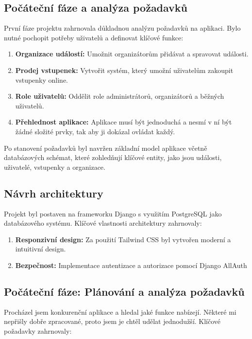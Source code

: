 \documentclass[12pt, a4paper,
twoside,        %
openright
]{report}
\begin{document}
\subsection{Počáteční fáze a analýza požadavků}

První fáze projektu zahrnovala důkladnou analýzu požadavků na aplikaci. Bylo nutné pochopit potřeby uživatelů a definovat klíčové funkce:

\begin{enumerate}
	\item \textbf{Organizace událostí:} Umožnit organizátorům přidávat a spravovat události.
	\item \textbf{Prodej vstupenek:} Vytvořit systém, který umožní uživatelům zakoupit vstupenky online.
	\item \textbf{Role uživatelů:} Oddělit role administrátorů, organizátorů a běžných uživatelů.
	\item \textbf{Přehlednost aplikace:} Aplikace musí být jednoduchá a nesmí v ní být žádné složité prvky, tak aby ji dokázal ovládat každý.
\end{enumerate}

Po stanovení požadavků byl navržen základní model aplikace včetně databázových schémat, které zohledňují klíčové entity, jako jsou události, uživatelé, vstupenky a organizace.

\subsection{Návrh architektury}

Projekt byl postaven na frameworku Django s využitím PostgreSQL jako databázového systému. Klíčové vlastnosti architektury zahrnovaly:

\begin{enumerate}
	\item \textbf{Responzivní design:} Za použití Tailwind CSS byl vytvořen moderní a intuitivní design.
	\item \textbf{Bezpečnost:} Implementace autentizace a autorizace pomocí Django AllAuth
\end{enumerate}

\subsection{Počáteční fáze: Plánování a analýza požadavků}

Procházel jsem konkurenční aplikace a hledal jaké funkce nabízejí. Některé mi nepřišly dobře zpracované, proto jsem je chtěl udělat jednodužší. Klíčové požadavky zahrnovaly:
\end{document}
